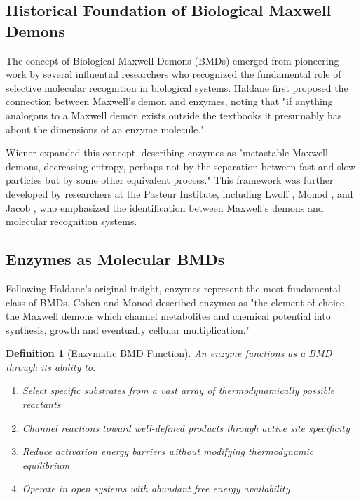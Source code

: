 \documentclass[12pt,a4paper]{article}
\newtheorem{definition}{Definition}[section]
\begin{document}
\subsection{Historical Foundation of Biological Maxwell Demons}

The concept of Biological Maxwell Demons (BMDs) emerged from pioneering work by several influential researchers who recognized the fundamental role of selective molecular recognition in biological systems. Haldane \citep{haldane1930} first proposed the connection between Maxwell's demon and enzymes, noting that "if anything analogous to a Maxwell demon exists outside the textbooks it presumably has about the dimensions of an enzyme molecule."

Wiener \citep{wiener1948} expanded this concept, describing enzymes as "metastable Maxwell demons, decreasing entropy, perhaps not by the separation between fast and slow particles but by some other equivalent process." This framework was further developed by researchers at the Pasteur Institute, including Lwoff \citep{lwoff1962}, Monod \citep{monod1972}, and Jacob \citep{jacob1973}, who emphasized the identification between Maxwell's demons and molecular recognition systems.

\subsection{Enzymes as Molecular BMDs}

Following Haldane's original insight, enzymes represent the most fundamental class of BMDs. Cohen and Monod \citep{cohen1957} described enzymes as "the element of choice, the Maxwell demons which channel metabolites and chemical potential into synthesis, growth and eventually cellular multiplication."

\begin{definition}[Enzymatic BMD Function]
An enzyme functions as a BMD through its ability to:
\begin{enumerate}
\item Select specific substrates from a vast array of thermodynamically possible reactants
\item Channel reactions toward well-defined products through active site specificity
\item Reduce activation energy barriers without modifying thermodynamic equilibrium
\item Operate in open systems with abundant free energy availability
\end{enumerate}
\end{definition}
\end{document}
